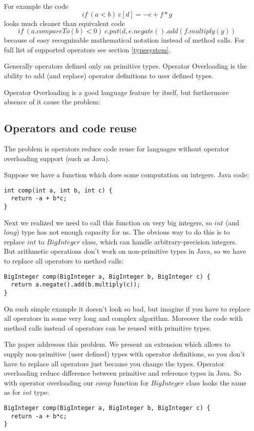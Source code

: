 \documentclass{aircc}
\begin{document}
For example the code
$$if~(a<b)~c[d] = -e+f*g$$
looks much cleaner than equivalent code
$$if~(a.compareTo(b)<0)~c.put(d, e.negate().add(f.multiply(g))$$
because of easy recognizable mathematical notation instead of method calls. For full list of supported operators see section \ref{typesystem}.

Generally operators defined only on primitive types.
Operator Overloading is the ability to add (and replace) operator definitions to user defined types.

Operator Overloading is a good language feature by itself,
but furthermore absence of it cause the problem:

\subsection{Operators and code reuse \label{codereuse}}
The problem is operators reduce code reuse for languages without operator overloading support (such as Java).

Suppose we have a function which does some computation on integers. Java code:
\begin{lstlisting}
int comp(int a, int b, int c) {
  return -a + b*c;
}
\end{lstlisting}
Next we realized we need to call this function on very big integers, so $int$ (and $long$) type has not enough capacity for us.
The obvious way to do this is to replace $int$ to $BigInteger$ class, which can handle arbitrary-precision integers.
But arithmetic operations don't work on non-primitive types in Java,
so we have to replace all operators to method calls:
\begin{lstlisting}
BigInteger comp(BigInteger a, BigInteger b, BigInteger c) {
  return a.negate().add(b.multiply(c));
}
\end{lstlisting}
On such simple example it doesn't look so bad, but imagine if you have to replace all operators in some very long and complex algorithm.
Moreover the code with method calls instead of operators can be reused with primitive types.

The paper addresses this problem. We present an extension which allows to supply non-primitive (user defined) types
with operator definitions, so you don't have to replace all operators just because you change the types.
Operator overloading reduce difference between primitive and reference types in Java.
So with operator overloading our $comp$ function for $BigInteger$ class looks the same as for $int$ type:
\begin{lstlisting}
BigInteger comp(BigInteger a, BigInteger b, BigInteger c) {
  return -a + b*c;
}
\end{lstlisting}
\end{document}
